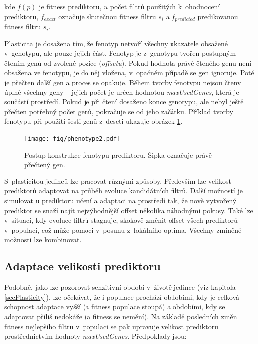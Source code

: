 \noindent{}kde $f \left( p \right)$ je fitness prediktoru, $u$ počet filtrů použitých k~ohodnocení prediktoru, $f_{\mathit{exact}}$ označuje skutečnou fitness filtru $s_i$ a $f_{\mathit{predicted}}$ predikovanou fitness filtru $s_i$.

Plasticita je dosažena tím, že fenotyp netvoří všechny ukazatele obsažené v~genotypu, ale pouze jejich část. Fenotyp je z~genotypu tvořen postupným čtením genů od zvolené pozice (\emph{offsetu}). Pokud hodnota právě čteného genu není obsažena ve fenotypu, je do něj vložena, v~opačném případě se gen ignoruje. Poté je přečten další gen a proces se opakuje. Během tvorby fenotypu nejsou čteny úplně všechny geny -- jejich počet je určen hodnotou \emph{maxUsedGenes}, která je součástí prostředí. Pokud je při čtení dosaženo konce genotypu, ale nebyl ještě přečten potřebný počet genů, pokračuje se od jeho začátku. Příklad tvorby fenotypu při použití šesti genů z~deseti ukazuje obrázek \ref{obrFenotyp}.

\begin{figure}[htb]
    \centering\texttt{[image: fig/phenotype2.pdf]}
    \caption{Postup konstrukce fenotypu prediktoru. Šipka označuje právě přečtený gen.}
    \label{obrFenotyp}
\end{figure}

S~plasticitou jedinců lze pracovat různými způsoby. Především lze velikost prediktorů adaptovat na průběh evoluce kandidátních filtrů. Další možností je simulovat u prediktoru učení a adaptaci na prostředí tak, že nově vytvořený prediktor se snaží najít nejvýhodnější offset několika náhodnými pokusy. Také lze v~situaci, kdy evoluce filtrů stagnuje, skokově změnit offset všech prediktorů v~populaci, což může pomoci v~posunu z~lokálního optima. Všechny zmíněné možnosti lze kombinovat.

\subsection{Adaptace velikosti prediktoru}
\label{secDesignAdaptation}

Podobně, jako lze pozorovat senzitivní období v~životě jedince (viz kapitola \ref{secPlasticity}), lze očekávat, že i populace prochází obdobími, kdy je celková schopnost adaptace vyšší (a fitness populace stoupá) a obdobími, kdy se adaptovat příliš nedokáže (a fitness se nemění). Na základě posledních změn fitness nejlepšího filtru v~populaci se pak upravuje velikost prediktoru prostřednictvím hodnoty \emph{maxUsedGenes}. Předpoklady jsou:

